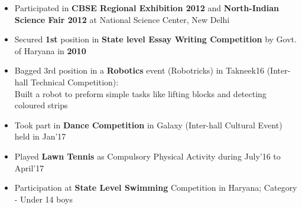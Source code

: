 \documentclass[10pt]{extarticle}
\begin{document}
\begin{itemize}
\item Participated in \textbf{CBSE Regional Exhibition 2012} and \textbf{North-Indian Science Fair 2012} at National Science Center, New Delhi
\item Secured \textbf{1st} position in \textbf{State level Essay Writing Competition} by Govt. of Haryana in \textbf{2010}
\item Bagged 3rd position in a \textbf{Robotics} event (Robotricks) in Takneek\textsc{}16 (Inter-hall Technical Competition):
\\Built a robot to preform simple tasks like lifting blocks and detecting coloured strips
\item Took part in \textbf{Dance Competition} in Galaxy (Inter-hall Cultural Event) held in Jan'17
\item Played \textbf{Lawn Tennis} as Compulsory Physical Activity during July'16 to April'17
\item Participation at \textbf{State Level Swimming} Competition in Haryana; Category - Under 14 boys
\end{itemize}
\end{document}
